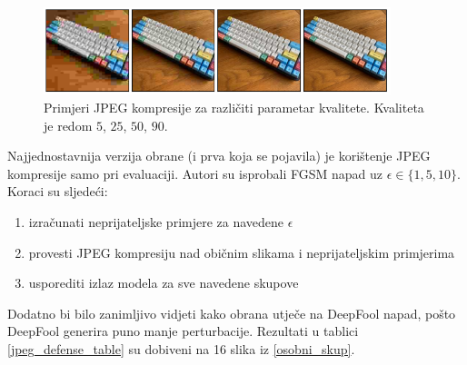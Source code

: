 \documentclass[utf8, diplomski]{fer}
\begin{document}
\begin{figure}[H]
\centering
\includegraphics[width=0.9\textwidth,keepaspectratio]{img/other/jpeg_examples.png}
\caption{Primjeri JPEG kompresije za različiti parametar kvalitete. Kvaliteta je redom $5$, $25$, $50$, $90$.}
\label{fig:jpeg_examples}
\end{figure}

\par
Najjednostavnija verzija obrane (i prva koja se pojavila) je korištenje JPEG kompresije samo pri evaluaciji. Autori su isprobali FGSM napad uz $\epsilon \in \{1, 5, 10\}$. Koraci su sljedeći:
\begin{enumerate}[noitemsep, label=\textbullet]
  \item izračunati neprijateljske primjere za navedene $\epsilon$
  \item provesti JPEG kompresiju nad običnim slikama i neprijateljskim primjerima
  \item usporediti izlaz modela za sve navedene skupove
\end{enumerate} 
Dodatno bi bilo zanimljivo vidjeti kako obrana utječe na DeepFool napad, pošto DeepFool generira puno manje perturbacije. Rezultati u tablici \ref{jpeg_defense_table} su dobiveni na 16 slika iz \ref{osobni_skup}. 
\end{document}
